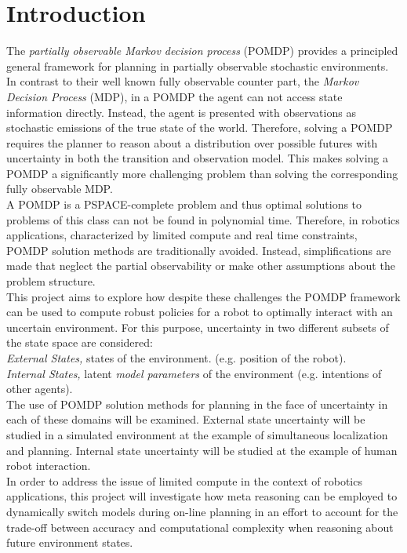 \chapter{Introduction}

The \textit{partially observable Markov decision process} (POMDP) provides
a principled general framework for planning in partially observable stochastic
environments. In contrast to their well known fully observable counter part,
the \textit{Markov Decision Process} (MDP), in a POMDP the agent can not access
state information directly. Instead, the agent is presented with observations
as stochastic emissions of the true state of the world. Therefore, solving
a POMDP requires the planner to reason about a distribution over possible
futures with uncertainty in both the transition and observation model. This
makes solving a POMDP a significantly more challenging problem than solving the
corresponding fully observable MDP.\\

A POMDP is a PSPACE-complete problem and thus optimal solutions to problems of
this class can not be found in polynomial time. Therefore, in robotics
applications, characterized by limited compute and real time constraints, POMDP
solution methods are traditionally avoided. Instead, simplifications are made
that neglect the partial observability or make other assumptions about the
problem structure.\\

This project aims to explore how despite these challenges the POMDP
framework can be used to compute robust policies for a robot to optimally
interact with an uncertain environment. For this purpose, uncertainty in
two different subsets of the state space are considered:\\
\textit{External States,}  states of the environment. (e.g. position of the
robot).\\
\textit{Internal States,} latent \textit{model parameters} of the
environment (e.g. intentions of other agents).\\

The use of POMDP solution methods for planning in the face of uncertainty in
each of these domains will be examined. External state uncertainty will be
studied in a simulated environment at the example of simultaneous localization
and planning. Internal state uncertainty will be studied at the example of
human robot interaction.\\
In order to address the issue of limited compute in the context of robotics
applications, this project will investigate how meta reasoning can be employed to
dynamically switch models during on-line planning in an effort to account for
the trade-off between accuracy and computational complexity when reasoning about
future environment states.
